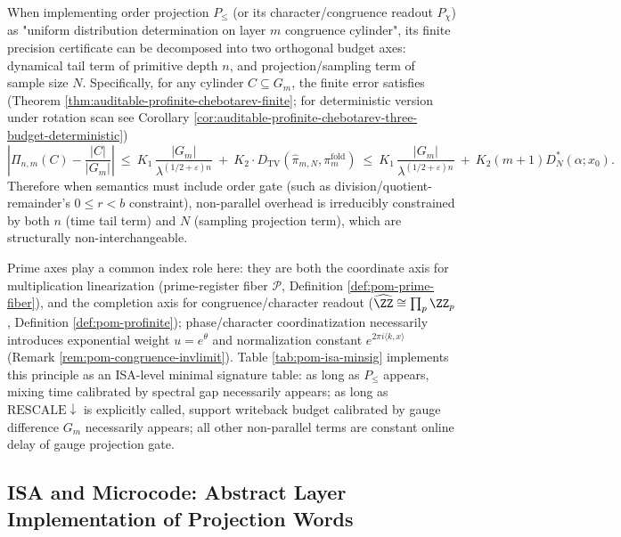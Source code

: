 \begin{remark}\label{rem:pom-order-three-budget}
When implementing order projection \(P_{\le}\) (or its character/congruence readout \(P_\chi\)) as "uniform distribution determination on layer \(m\) congruence cylinder", its finite precision certificate can be decomposed into two orthogonal budget axes: dynamical tail term of primitive depth \(n\), and projection/sampling term of sample size \(N\).
Specifically, for any cylinder \(C\subseteq G_m\), the finite error satisfies (Theorem \ref{thm:auditable-profinite-chebotarev-finite}; for deterministic version under rotation scan see Corollary \ref{cor:auditable-profinite-chebotarev-three-budget-deterministic})
\[
\left|\Pi_{n,m}(C)-\frac{|C|}{|G_m|}\right|
\ \le\
K_1\,\frac{|G_m|}{\lambda^{(1/2+\varepsilon)n}}
\ +\
K_2\cdot D_{\mathrm{TV}}(\hat{\pi}_{m,N},\pi_m^{\mathrm{fold}})
\ \le\
K_1\,\frac{|G_m|}{\lambda^{(1/2+\varepsilon)n}}
\ +\
K_2(m+1)D_N^*(\alpha;x_0).
\]
Therefore when semantics must include order gate (such as division/quotient-remainder's \(0\le r<b\) constraint), non-parallel overhead is irreducibly constrained by both \(n\) (time tail term) and \(N\) (sampling projection term), which are structurally non-interchangeable.
\end{remark}
Prime axes play a common index role here: they are both the coordinate axis for multiplication linearization (prime-register fiber \(\mathcal{P}\), Definition \ref{def:pom-prime-fiber}), and the completion axis for congruence/character readout (\(\widehat{\ZZ}\cong\prod_p\ZZ_p\), Definition \ref{def:pom-profinite}); phase/character coordinatization necessarily introduces exponential weight \(u=e^\theta\) and normalization constant \(e^{2\pi i\langle k,x\rangle}\) (Remark \ref{rem:pom-congruence-invlimit}).
Table \ref{tab:pom-isa-minsig} implements this principle as an ISA-level minimal signature table: as long as \(P_{\le}\) appears, mixing time calibrated by spectral gap necessarily appears; as long as \(\mathrm{RESCALE}\downarrow\) is explicitly called, support writeback budget calibrated by gauge difference \(G_m\) necessarily appears; all other non-parallel terms are constant online delay of gauge projection gate.

\subsection{ISA and Microcode: Abstract Layer Implementation of Projection Words}\label{subsec:pom-isa}
